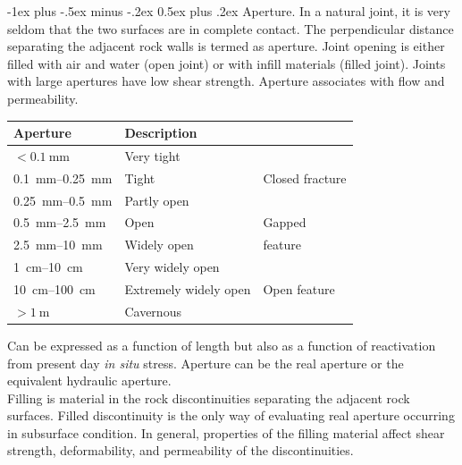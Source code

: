 \documentclass[10pt,landscape,a4paper]{article}
\makeatletter
\renewcommand{\section}{\@startsection{section}{1}{0mm}%
	{-1ex plus -.5ex minus -.2ex}%
	{0.5ex plus .2ex}%
	{\normalfont\large\bfseries}}
\makeatother
\begin{document}
\begin{multicols}{3}
		\section{Aperture.}
		In a natural joint, it is very seldom that the two surfaces are in complete contact.
		The perpendicular distance separating the adjacent rock walls is termed as aperture.
		Joint opening is either filled with air and water (open joint) or with infill materials (filled joint).
		Joints with large apertures have low shear strength.
		Aperture associates with flow and permeability.
			\begin{table}[H]\scriptsize\centering\begin{tabular}{lll}
				Aperture & Description & \\
				\hline
				$<\SI{0.1}{\milli\meter}$ & Very tight & \\
				\SIrange{0.1}{0.25}{\milli\meter} & Tight & Closed fracture\\
				\SIrange{0.25}{0.5}{\milli\meter} & Partly open & \\
				\hline
				\SIrange{0.5}{2.5}{\milli\meter} & Open & Gapped \\
				\SIrange{2.5}{10}{\milli\meter} & Widely open & feature \\
				\hline
				\SIrange{1}{10}{\centi\meter} & Very widely open & \\
				\SIrange{10}{100}{\centi\meter} & Extremely widely open & Open feature \\
				$>\SI{1}{\meter}$ & Cavernous &
			\end{tabular}\end{table}
		Can be expressed as a function of length but also as a function of reactivation from present day \textit{in situ} stress.
		Aperture can be the real aperture or the equivalent hydraulic aperture.\\
		Filling is material in the rock discontinuities separating the adjacent rock surfaces.
		Filled discontinuity is the only way of evaluating real aperture occurring in subsurface condition.
		In general, properties of the filling material affect shear strength, deformability, and permeability of the discontinuities.
		

\end{multicols}
\end{document}
